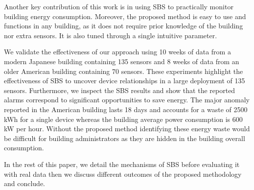 Another key contribution of this work is in using SBS to practically monitor building energy consumption.
Moreover, the proposed method is easy to use and functions in any building, as it does not require prior knowledge of the building nor extra sensors.  
It is also tuned through a single intuitive parameter.  %

We validate the effectiveness of our approach using 10 weeks of data from a modern Japanese building containing 135 sensors and 
8 weeks of data from an older American building containing 70 sensors.
These experiments highlight the effectiveness of SBS to uncover device relationships in a large deployment of 135 sensors.
Furthermore, we inspect the SBS results and show that the reported alarms correspond to significant opportunities to save energy.
The major anomaly reported in the American building lasts 18 days and accounts for a waste of 2500 kWh for a single device whereas the building average power consumption is 600 kW per hour.
Without the proposed method identifying these energy waste would be difficult for building administrators as they are hidden in the building overall consumption.

In the rest of this paper, we detail the mechanisms of SBS before evaluating it with real data then we discuss different outcomes of the proposed methodology and conclude.
